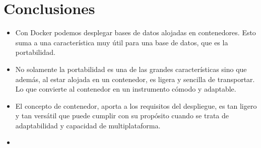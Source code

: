 \section{Conclusiones} 

\begin{itemize}
	\item Con Docker podemos desplegar bases de datos alojadas en contenedores. Esto suma a una característica muy útil para una base de datos, que es la portabilidad.
	\item No solamente la portabilidad es una de las grandes características sino que además, al estar alojada en un contenedor, es ligera y sencilla de transportar. Lo que convierte al contenedor en un instrumento cómodo y adaptable.
	\item El concepto de contenedor, aporta a los requisitos del despliegue, es tan ligero y tan versátil que puede cumplir con su propósito cuando se trata de adaptabilidad y capacidad de multiplataforma.
	\item 

\end{itemize} 
